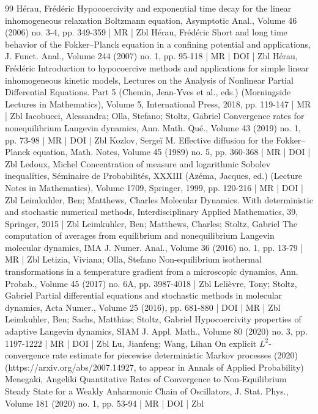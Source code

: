 \documentclass[10pt]{amsart}
\theoremstyle{definition}\newtheorem{defi}[theo]{Definition}\newtheorem{rema}[theo]{Remark}\newtheorem{exam}[theo]{Example}\newtheorem{exem}[theo]{Example}\newtheorem{nota}[theo]{Notation}
\begin{document}
\begin{thebibliography}{99}
Hérau, Frédéric Hypocoercivity and exponential time decay for the linear inhomogeneous relaxation Boltzmann equation, Asymptotic Anal., Volume 46 (2006) no. 3-4, pp. 349-359 | MR | Zbl
Hérau, Frédéric Short and long time behavior of the Fokker–Planck equation in a confining potential and applications, J. Funct. Anal., Volume 244 (2007) no. 1, pp. 95-118 | MR | DOI | Zbl
Hérau, Frédéric Introduction to hypocoercive methods and applications for simple linear inhomogeneous kinetic models, Lectures on the Analysis of Nonlinear Partial Differential Equations. Part 5 (Chemin, Jean-Yves et al., eds.) (Morningside Lectures in Mathematics), Volume 5, International Press, 2018, pp. 119-147 | MR | Zbl
Iacobucci, Alessandra; Olla, Stefano; Stoltz, Gabriel Convergence rates for nonequilibrium Langevin dynamics, Ann. Math. Qué., Volume 43 (2019) no. 1, pp. 73-98 | MR | DOI | Zbl
Kozlov, Sergeĭ M. Effective diffusion for the Fokker–Planck equation, Math. Notes, Volume 45 (1989) no. 5, pp. 360-368 | MR | DOI | Zbl
Ledoux, Michel Concentration of measure and logarithmic Sobolev inequalities, Séminaire de Probabilités, XXXIII (Azéma, Jacques, ed.) (Lecture Notes in Mathematics), Volume 1709, Springer, 1999, pp. 120-216 | MR | DOI | Zbl
Leimkuhler, Ben; Matthews, Charles Molecular Dynamics. With deterministic and stochastic numerical methods, Interdisciplinary Applied Mathematics, 39, Springer, 2015 | Zbl
Leimkuhler, Ben; Matthews, Charles; Stoltz, Gabriel The computation of averages from equilibrium and nonequilibrium Langevin molecular dynamics, IMA J. Numer. Anal., Volume 36 (2016) no. 1, pp. 13-79 | MR | Zbl
Letizia, Viviana; Olla, Stefano Non-equilibrium isothermal transformations in a temperature gradient from a microscopic dynamics, Ann. Probab., Volume 45 (2017) no. 6A, pp. 3987-4018 | Zbl
Lelièvre, Tony; Stoltz, Gabriel Partial differential equations and stochastic methods in molecular dynamics, Acta Numer., Volume 25 (2016), pp. 681-880 | DOI | MR | Zbl
Leimkuhler, Ben; Sachs, Matthias; Stoltz, Gabriel Hypocoercivity properties of adaptive Langevin dynamics, SIAM J. Appl. Math., Volume 80 (2020) no. 3, pp. 1197-1222 | MR | DOI | Zbl
Lu, Jianfeng; Wang, Lihan On explicit ${L}^2$-convergence rate estimate for piecewise deterministic Markov processes (2020) (https://arxiv.org/abs/2007.14927, to appear in Annals of Applied Probability)
Menegaki, Angeliki Quantitative Rates of Convergence to Non-Equilibrium Steady State for a Weakly Anharmonic Chain of Oscillators, J. Stat. Phys., Volume 181 (2020) no. 1, pp. 53-94 | MR | DOI | Zbl

\end{thebibliography}
\end{document}
